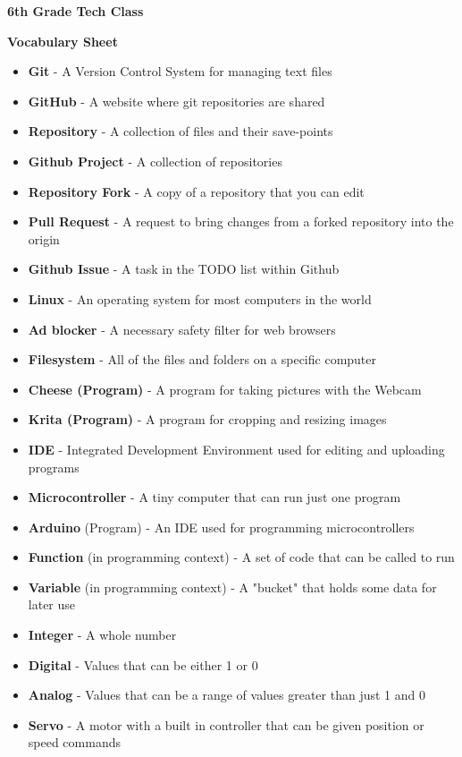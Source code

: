 \documentclass{article}
\begin{document}
	
{\huge \textbf{6th Grade Tech Class}}

\vspace{1cm}

{\huge \textbf{Vocabulary Sheet}}

\begin{itemize}
  \item \textbf{Git} - A Version Control System for managing text files
  \item \textbf{GitHub} - A website where git repositories are shared
  \item \textbf{Repository} - A collection of files and their save-points
  \item \textbf{Github Project} - A collection of repositories 
  \item \textbf{Repository Fork} - A copy of a repository that you can edit
  \item \textbf{Pull Request} - A request to bring changes from a forked repository into the origin
  \item \textbf{Github Issue} - A task in the TODO list within Github
  \item \textbf{Linux }- An operating system for most computers in the world
  \item \textbf{Ad blocker} - A necessary safety filter for web browsers
  \item \textbf{Filesystem }- All of the files and folders on a specific computer
  \item \textbf{Cheese (Program)} - A program for taking pictures with the Webcam
  \item \textbf{Krita (Program) }- A program for cropping and resizing images
  \item \textbf{IDE} - Integrated Development Environment used for editing and uploading programs
  \item \textbf{Microcontroller} - A tiny computer that can run just one program
  \item \textbf{Arduino} (Program) - An IDE used for programming microcontrollers
  \item \textbf{Function} (in programming context) - A set of code that can be called to run
  \item \textbf{Variable} (in programming context) - A "bucket" that holds some data for later use
  \item \textbf{Integer} - A whole number
  \item \textbf{Digital} - Values that can be either 1 or 0
  \item \textbf{Analog} - Values that can be a range of values greater than just 1 and 0
  \item \textbf{Servo} - A motor with a built in controller that can be given position or speed commands
  
\end{itemize}
\end{document}
